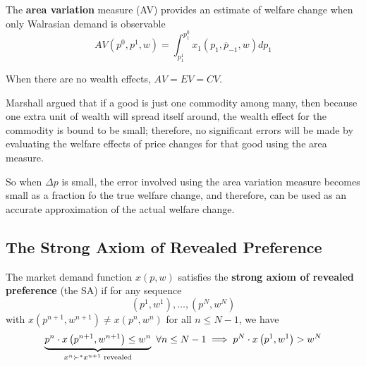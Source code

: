 \documentclass{article}
\begin{document}
 			\begin{definition}
 				The \textbf{area variation} measure (AV) provides an estimate of welfare change when only Walrasian demand is observable
 				\begin{equation}
 					A V\left(p^{0}, p^{1}, w\right)=\int_{p_{1}^{1}}^{p_{1}^{0}} x_{1}\left(p_{1}, \overline{p}_{-1}, w\right) d p_{1}
 				\end{equation}
 			\end{definition}
 			
 			\begin{remark}
 				When there are no wealth effects, $AV=EV=CV$.
 			\end{remark}
 			
 			\begin{remark}
 				Marshall argued that if a good is just one commodity among many, then because one extra unit of wealth will spread itself around, the wealth effect for the commodity is bound to be small; therefore, no significant errors will be made by evaluating the welfare effects of price changes for that good using the area measure.
 			\end{remark}
 			
 			\begin{remark}
 				So when $\Delta p$ is small, the error involved using the area variation measure becomes small as a fraction fo the true welfare change, and therefore, can be used as an accurate approximation of the actual welfare change.
 			\end{remark}
 			
 		\subsection{The Strong Axiom of Revealed Preference}
 			\begin{definition}[3.J.1]
 				The market demand function $x(p, w)$ satisfies the \textbf{strong axiom of revealed preference} (the SA) if for any sequence
 				\begin{equation}
 					\left(p^{1}, w^{1}\right), \ldots,\left(p^{N}, w^{N}\right)
 				\end{equation}
 				with $x\left(p^{n+1}, w^{n+1}\right) \neq x\left(p^{n}, w^{n}\right)$ for all $n \leq N-1$, we have 
 				\begin{equation}
 					\underbrace{p^{n} \cdot x\left(p^{n+1}, w^{n+1}\right) \leq w^{n}}_{x^n \succ^* x^{n+1} \text{{ revealed}}}
 					\ \forall n \leq N - 1
 					\implies p^{N} \cdot x\left(p^1, w^1\right)>w^{N}
 				\end{equation}
 			\end{definition}
 			
\end{document}
